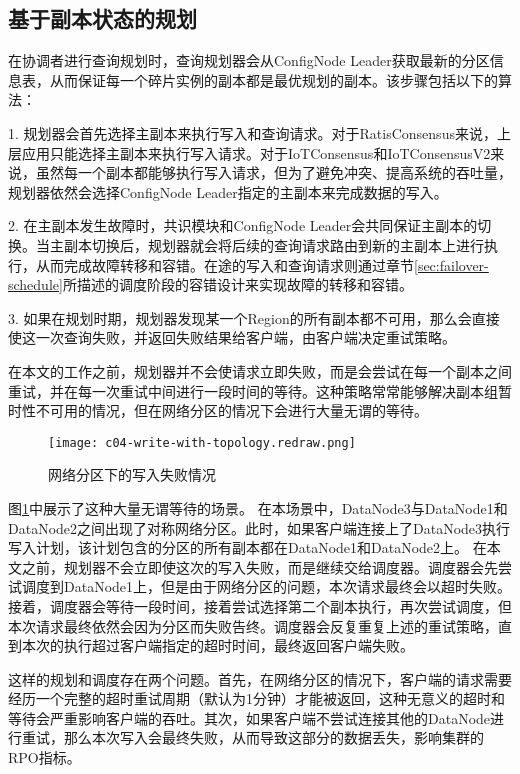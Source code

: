 \subsection{基于副本状态的规划}

在协调者进行查询规划时，查询规划器会从ConfigNode Leader获取最新的分区信息表，从而保证每一个碎片实例的副本都是最优规划的副本。该步骤包括以下的算法：

1. 规划器会首先选择主副本来执行写入和查询请求。对于RatisConsensus来说，上层应用只能选择主副本来执行写入请求。对于IoTConsensus和IoTConsensusV2来说，虽然每一个副本都能够执行写入请求，但为了避免冲突、提高系统的吞吐量，规划器依然会选择ConfigNode Leader指定的主副本来完成数据的写入。

2. 在主副本发生故障时，共识模块和ConfigNode Leader会共同保证主副本的切换。当主副本切换后，规划器就会将后续的查询请求路由到新的主副本上进行执行，从而完成故障转移和容错。在途的写入和查询请求则通过章节\ref{sec:failover-schedule}所描述的调度阶段的容错设计来实现故障的转移和容错。

3. 如果在规划时期，规划器发现某一个Region的所有副本都不可用，那么会直接使这一次查询失败，并返回失败结果给客户端，由客户端决定重试策略。

在本文的工作之前，规划器并不会使请求立即失败，而是会尝试在每一个副本之间重试，并在每一次重试中间进行一段时间的等待。这种策略常常能够解决副本组暂时性不可用的情况，但在网络分区的情况下会进行大量无谓的等待。

\begin{figure}
  \centering
  \texttt{[image: c04-write-with-topology.redraw.png]}
  \caption{网络分区下的写入失败情况}
  \label{fig:c04-write-with-topology}
\end{figure}

图\ref{fig:c04-write-with-topology}中展示了这种大量无谓等待的场景。
在本场景中，DataNode3与DataNode1和DataNode2之间出现了对称网络分区。此时，如果客户端连接上了DataNode3执行写入计划，该计划包含的分区的所有副本都在DataNode1和DataNode2上。
在本文之前，规划器不会立即使这次的写入失败，而是继续交给调度器。调度器会先尝试调度到DataNode1上，但是由于网络分区的问题，本次请求最终会以超时失败。接着，调度器会等待一段时间，接着尝试选择第二个副本执行，再次尝试调度，但本次请求最终依然会因为分区而失败告终。调度器会反复重复上述的重试策略，直到本次的执行超过客户端指定的超时时间，最终返回客户端失败。

这样的规划和调度存在两个问题。首先，在网络分区的情况下，客户端的请求需要经历一个完整的超时重试周期（默认为1分钟）才能被返回，这种无意义的超时和等待会严重影响客户端的吞吐。其次，如果客户端不尝试连接其他的DataNode进行重试，那么本次写入会最终失败，从而导致这部分的数据丢失，影响集群的RPO指标。

